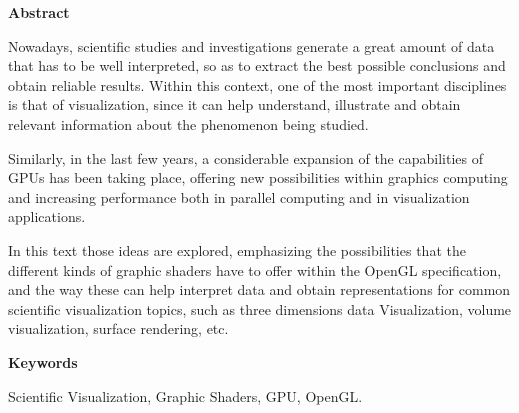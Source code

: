 
\newpage

\thispagestyle{empty}

\begin{center}

{\bf \Huge Abstract}

  \end{center}
\vspace{1cm}

	Nowadays, scientific studies and investigations generate a great amount of
	data that has to be well interpreted, so as to extract the best possible
	conclusions and obtain reliable results. Within this context, one of the
	most important disciplines is that of visualization, since it can help
	understand, illustrate and obtain relevant information about the phenomenon
	being studied.


	Similarly, in the last few years, a considerable expansion of the
	capabilities of GPUs has been taking place, offering new possibilities
	within graphics computing and increasing performance both in parallel
	computing and in visualization applications.


	In this text those ideas are explored, emphasizing the possibilities that
	the different kinds of graphic shaders  have to offer within the OpenGL
	specification, and the way these can help interpret data and obtain
	representations for common scientific visualization topics, such as three
	dimensions data Visualization, volume visualization, surface rendering, etc.

\vspace{1cm}


\begin{center}

{\bf \Large Keywords}

   \end{center}

   \vspace{0.5cm}
   
	Scientific Visualization, Graphic Shaders, GPU, OpenGL.
   


